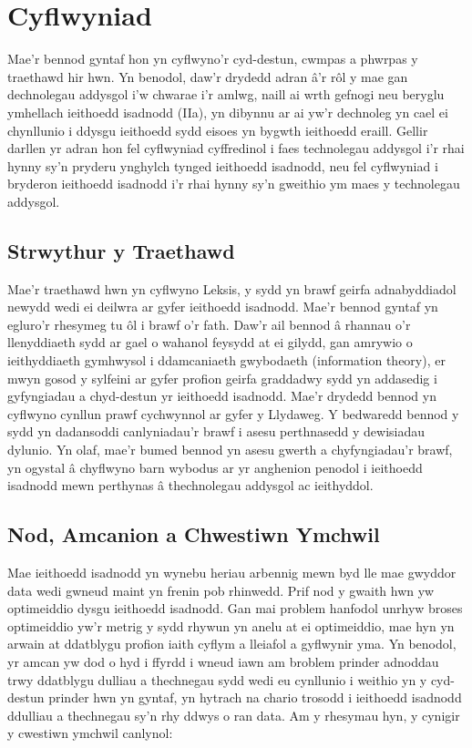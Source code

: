 \chapter{Cyflwyniad}    
Mae'r bennod gyntaf hon yn cyflwyno'r cyd-destun, cwmpas a phwrpas y traethawd hir hwn. Yn benodol, daw'r drydedd adran â'r rôl y mae gan dechnolegau addysgol i'w chwarae i'r amlwg, naill ai wrth gefnogi neu beryglu ymhellach ieithoedd isadnodd (IIa), yn dibynnu ar ai yw'r dechnoleg yn cael ei chynllunio i ddysgu ieithoedd sydd eisoes yn bygwth ieithoedd eraill. Gellir darllen yr adran hon fel cyflwyniad cyffredinol i faes technolegau addysgol i'r rhai hynny sy'n pryderu ynghylch tynged ieithoedd isadnodd, neu fel cyflwyniad i bryderon ieithoedd isadnodd i'r rhai hynny sy'n gweithio ym maes y technolegau addysgol.

\section{Strwythur y Traethawd}
Mae'r traethawd hwn yn cyflwyno Leksis, y sydd yn brawf geirfa adnabyddiadol newydd wedi ei deilwra ar gyfer ieithoedd isadnodd. Mae'r bennod gyntaf yn egluro'r rhesymeg tu ôl i brawf o'r fath. Daw'r ail bennod â rhannau o'r llenyddiaeth sydd ar gael o wahanol feysydd at ei gilydd, gan amrywio o ieithyddiaeth gymhwysol i ddamcaniaeth gwybodaeth (information theory), er mwyn gosod y sylfeini ar gyfer profion geirfa graddadwy sydd yn addasedig i gyfyngiadau a chyd-destun yr ieithoedd isadnodd. Mae'r drydedd bennod yn cyflwyno cynllun prawf cychwynnol ar gyfer y Llydaweg. Y bedwaredd bennod y sydd yn dadansoddi canlyniadau'r brawf i asesu perthnasedd y dewisiadau dylunio. Yn olaf, mae'r bumed bennod yn asesu gwerth a chyfyngiadau'r brawf, yn ogystal â chyflwyno barn wybodus ar yr anghenion penodol i ieithoedd isadnodd mewn perthynas â thechnolegau addysgol ac ieithyddol.

\section{Nod, Amcanion a Chwestiwn Ymchwil}
Mae ieithoedd isadnodd yn wynebu heriau arbennig mewn byd lle mae gwyddor data wedi gwneud maint yn frenin pob rhinwedd. Prif nod y gwaith hwn yw optimeiddio dysgu ieithoedd isadnodd. Gan mai problem hanfodol unrhyw broses optimeiddio yw'r metrig y sydd rhywun yn anelu at ei optimeiddio, mae hyn yn arwain at ddatblygu profion iaith cyflym a lleiafol a gyflwynir yma. Yn benodol, yr amcan yw dod o hyd i ffyrdd i wneud iawn am broblem prinder adnoddau trwy ddatblygu dulliau a thechnegau sydd wedi eu cynllunio i weithio yn y cyd-destun prinder hwn yn gyntaf, yn hytrach na chario trosodd i ieithoedd isadnodd ddulliau a thechnegau sy'n rhy ddwys o ran data. Am y rhesymau hyn, y cynigir y cwestiwn ymchwil canlynol:

